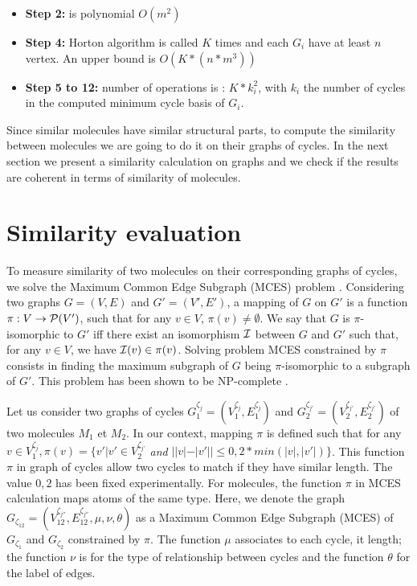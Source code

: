 \documentclass[journal=jacsat,manuscript=article]{achemso}
\begin{document}
\begin{itemize}
\item \textbf{ Step 2:} is polynomial $O(m^{2})$
\item \textbf{Step 4:} Horton algorithm is called $K$ times and each $G_i$ have at least $n$ vertex. An upper bound is $O(K*(n*m^{3}))$
\item \textbf{Step 5 to 12: } number of operations is : $K*k_i^2$, with $k_i$ the number of cycles in the computed minimum cycle basis of $G_i$.
\end{itemize}

Since similar molecules have similar structural parts, to compute the similarity between molecules we are going to do it on their graphs of cycles. In the next section we present a similarity calculation on graphs and we check if the results are coherent in terms of similarity of molecules.



\section{Similarity evaluation}


To measure similarity of two molecules on their corresponding graphs of cycles, we solve the Maximum Common Edge Subgraph (MCES) problem \cite{Raymond2002}. Considering two graphs $G=(V,E)$ and $G'=(V',E')$, a mapping of $G$ on $G'$ is a function  $\pi:V \rightarrow {\cal P}(V')$, such that for any $v \in V$, $\pi(v)\neq \emptyset$. We say that $G$ is \mbox{$\pi$-isomorphic} to $G'$ iff there exist an isomorphism $\cal I$ between $G$ and $G'$ such that, for any $v\in V$, we have ${\cal I}(v) \in \pi(v)$. Solving problem MCES  constrained by $\pi$ consists in finding the maximum subgraph of $G$ being $\pi$-isomorphic to a subgraph of $G'$. This problem has been shown to be NP-complete \cite{Raymond2002}.


Let us consider two graphs of cycles  $G^{\zeta_j}_1= (V^{\zeta_j}_1,E^{\zeta_j}_1)$ and $G^{\zeta_{j'}}_2= (V^{\zeta_{j'}}_2,E^{\zeta_{j'}}_2)$ of two molecules $M_1$ et $M_2$. In our context, mapping $\pi$ is defined such that  for any $v \in V^{\zeta_j}_1 , \pi(v)= \{ v' | v' \in V^{\zeta_{j'}}_2$  \textit{and} $  | |v| -|v'|| \leq 0,2 *min (  |v|,|v'| )\}$. This function $\pi$ in graph of cycles allow two cycles to match if they have similar length. The value $0,2$ has been fixed experimentally. For molecules, the  function  $\pi$ in MCES calculation \cite{Raymond2002} maps atoms of the same type. Here, we denote the graph  $G_{\zeta_{12}} = (V^{\zeta_{j''}}_{12},E^{\zeta_{j''}}_{12},\mu,\nu,\theta)$ as a Maximum Common Edge Subgraph (MCES) of $G_{\zeta_1}$ and $G_{\zeta_2}$ constrained by $\pi$. The function $\mu$ associates to each cycle, it length; the function $\nu$ is for the type of relationship between cycles and the function $\theta$ for the label of edges.
\end{document}

